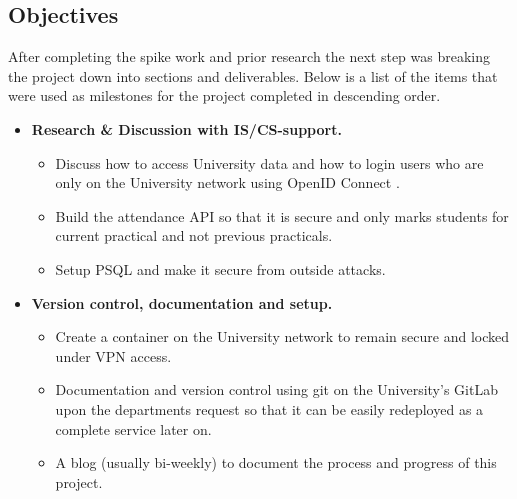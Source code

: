 \subsection{Objectives}\label{sec1:obj}
After completing the spike work and prior research the next step was breaking the project down into sections and deliverables. Below is a list of the items that were used as milestones for the project completed in descending order.

\begin{itemize}
	\item \textbf{Research \& Discussion with IS/CS-support.}
	\begin{itemize}
		\item Discuss how to access University data and how to login users who are only on the University network using OpenID Connect \cite{OpenID}.
		\item Build the attendance API so that it is secure and only marks students for current practical and not previous practicals.
		\item Setup PSQL \cite{psql} and make it secure from outside attacks.
	\end{itemize}
	
	\item \textbf{Version control, documentation and setup.}
	\begin{itemize}
		\item Create a container on the University network to remain secure and locked under VPN access.
		\item Documentation and version control using git on the University's GitLab upon the departments request so that it can be easily redeployed as a complete service later on.
		\item A blog (usually bi-weekly) to document the process and progress of this project.
	\end{itemize}
	

\end{itemize}
